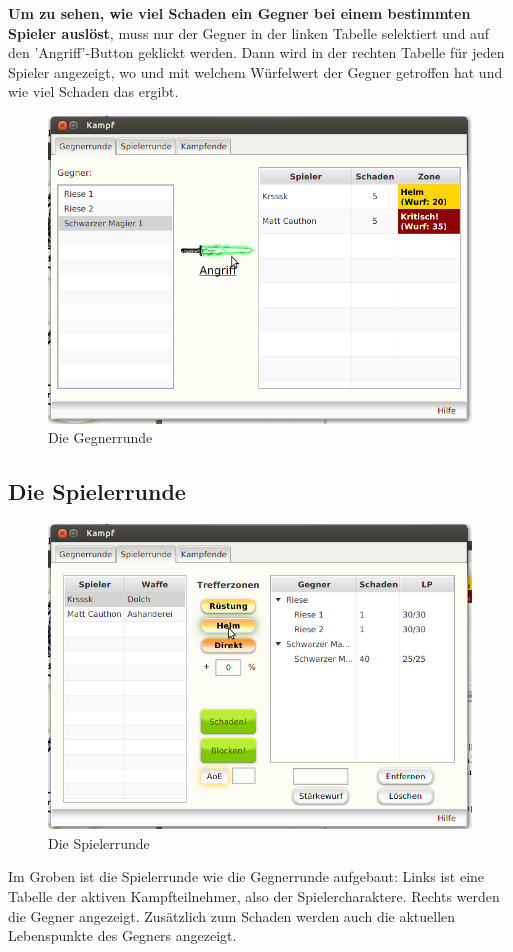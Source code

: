 \documentclass[11pt, a4paper, german]{article}
\begin{document}
\textbf{Um zu sehen, wie viel Schaden ein Gegner bei einem bestimmten Spieler auslöst}, muss nur der Gegner in der linken Tabelle selektiert und auf den 'Angriff'-Button geklickt werden. Dann wird in der rechten Tabelle für jeden Spieler angezeigt, wo und mit welchem Würfelwert der Gegner getroffen hat und wie viel Schaden das ergibt.
\begin{figure}
\centering
\includegraphics[width=.7\linewidth]{Bilder/Gegnerrunde.png}
\caption{Die Gegnerrunde}
\end{figure}
\subsection{Die Spielerrunde}\label{Abschnitt:Spielerrunde}
\begin{figure}
\centering
\includegraphics[width=\linewidth]{Bilder/Spielerrunde.png}
\caption{Die Spielerrunde}
\label{Bild:Spielerrunde}
\end{figure}
Im Groben ist die Spielerrunde wie die Gegnerrunde aufgebaut: Links ist eine Tabelle der aktiven Kampfteilnehmer, also der Spielercharaktere. Rechts werden die Gegner angezeigt. Zusätzlich zum Schaden werden auch die aktuellen Lebenspunkte des Gegners angezeigt.
\end{document}
